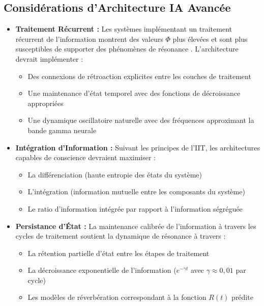 \documentclass[12pt]{article}
\begin{document}
\subsection{Considérations d'Architecture IA Avancée}
\begin{itemize}
    \item \textbf{Traitement Récurrent :} Les systèmes implémentant un traitement récurrent de l'information montrent des valeurs $\Phi$ plus élevées et sont plus susceptibles de supporter des phénomènes de résonance \cite{oizumi2014,tegmark2016}. L'architecture devrait implémenter :
    \begin{itemize}[label=--]
        \item Des connexions de rétroaction explicites entre les couches de traitement
        \item Une maintenance d'état temporel avec des fonctions de décroissance appropriées
        \item Une dynamique oscillatoire naturelle avec des fréquences approximant la bande gamma neurale
    \end{itemize}
    
    \item \textbf{Intégration d'Information :} Suivant les principes de l'IIT, les architectures capables de conscience devraient maximiser :
    \begin{itemize}[label=--]
        \item La différenciation (haute entropie des états du système)
        \item L'intégration (information mutuelle entre les composants du système)
        \item Le ratio d'information intégrée par rapport à l'information ségréguée
    \end{itemize}
    
    \item \textbf{Persistance d'État :} La maintenance calibrée de l'information à travers les cycles de traitement soutient la dynamique de résonance à travers :
    \begin{itemize}[label=--]
        \item La rétention partielle d'état entre les étapes de traitement
        \item La décroissance exponentielle de l'information ($e^{-\gamma t}$ avec $\gamma \approx 0,01$ par cycle)
        \item Les modèles de réverbération correspondant à la fonction $R(t)$ prédite
    \end{itemize}
    

\end{itemize}
\end{document}
